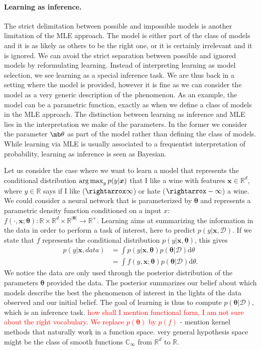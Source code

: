 \paragraph{Learning as inference.}
The strict delimitation between possible and impossible models is another limitation of the MLE approach. The model is either part of the class of models and it is as likely as others to be the right one, or it is certainly irrelevant and it is ignored. We can avoid the strict separation between possible and ignored models by reformulating learning. Instead of interpreting learning as model selection, we see learning as a special inference task. We are thus back in a setting where the model is provided, however it is fine as we can consider the model as a very generic description of the phenomenon. As an example, the model can be a parametric function, exactly as when we define a class of models in the MLE approach. The distinction between learning as inference and MLE lies in the interpretation we make of the parameters. In the former we consider the parameter $\mb \theta$ as part of the model rather than defining the class of models. While learning via MLE is usually associated to a frequentist interpretation of probability, learning as inference is seen as Bayesian.

Let us consider the case where we want to learn a model that represents the conditional distribution $\operatorname*{arg\,max}_y p(y|\bm x)$ that I like a wine with features $\bm x \in \mathbb{R}^d$, where $y \in \mathbb{R}$ says if I like ($\rightarrox \infty$) or hate ($\rightarrox -\infty$) a wine. We could consider a neural network that is parameterized by $\bm \theta$ and represents a parametric density function conditioned on a input $x$: $f(\cdot, \bm x;\bm \theta): \mathbb{R} \times \mathbb{R}^{d} \times \mathbb{R}^{|\bm \theta|} \rightarrow \mathbb{R}^+$.
Learning aims at summarizing the information in the data in order to perform a task of interest, here to predict $p(y|\bm x, \mathcal{D})$.
If we state that $f$ represents the conditional distribution $p(y|\bm x, \bm \theta)$, this gives
\begin{align}
  p(y|\bm x, data) &= \int p(y|\bm x, \bm \theta) p(\bm \theta | \mathcal{D}) \text{d}\theta\\
  &=\int f(y, \bm x;\bm \theta) p(\bm \theta | \mathcal{D}) \text{d}\theta.
\end{align}
We notice the data are only used through the posterior distribution of the parameters $\bm \theta$ provided the data. The posterior summarizes our belief about which models describe the best the phenomenon of interest in the lights of the data observed and our initial belief. The goal of learning is thus to compute $p(\bm \theta | \mathcal{D})$, which is an inference task. \textcolor{red}{how shall I mention functional form, I am not sure about the right vocabulary. We replace $p(\bm \theta)$ by $p(f)$} - mention kernel methods that naturally work in a function space.  very general hypothesis space might be the class of smooth functions $\mathbb{C}_\infty$ from $\mathbb{R}^d$ to $\mathbb{R}$.

